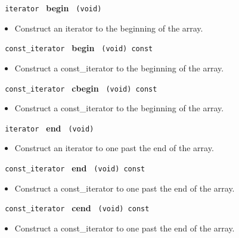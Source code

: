 
 
\noindent
\texttt{%
iterator
}
\textbf{begin}%
\texttt{%
(void)
}

\begin{itemize}
\item
Construct an iterator to the beginning of the array.
\end{itemize}
 
\noindent
\texttt{%
const\_iterator
}
\textbf{begin}%
\texttt{%
(void) const
}

\begin{itemize}
\item
Construct a const\_iterator to the beginning of the array.
\end{itemize}
 
\noindent
\texttt{%
const\_iterator
}
\textbf{cbegin}%
\texttt{%
(void) const
}

\begin{itemize}
\item
Construct a const\_iterator to the beginning of the array.
\end{itemize}
 
\noindent
\texttt{%
iterator
}
\textbf{end}%
\texttt{%
(void)
}

\begin{itemize}
\item
Construct an iterator to one past the end of the array.
\end{itemize}
 
\noindent
\texttt{%
const\_iterator
}
\textbf{end}%
\texttt{%
(void) const
}

\begin{itemize}
\item
Construct a const\_iterator to one past the end of the array.
\end{itemize}
 
\noindent
\texttt{%
const\_iterator
}
\textbf{cend}%
\texttt{%
(void) const
}

\begin{itemize}
\item
Construct a const\_iterator to one past the end of the array.
\end{itemize}
 
